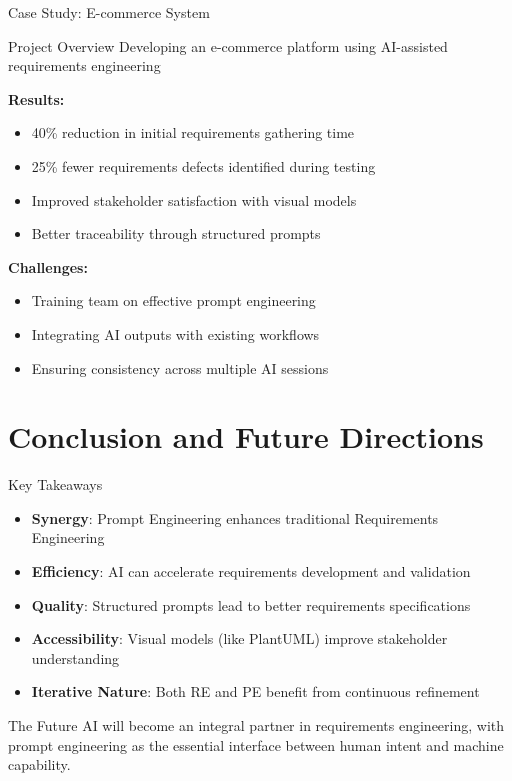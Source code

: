 \documentclass{beamer}
\begin{document}
\begin{frame}{Case Study: E-commerce System}
    \begin{block}{Project Overview}
        Developing an e-commerce platform using AI-assisted requirements engineering
    \end{block}
    
    \textbf{Results:}
    \begin{itemize}
        \item 40\% reduction in initial requirements gathering time
        \item 25\% fewer requirements defects identified during testing
        \item Improved stakeholder satisfaction with visual models
        \item Better traceability through structured prompts
    \end{itemize}
    
    \textbf{Challenges:}
    \begin{itemize}
        \item Training team on effective prompt engineering
        \item Integrating AI outputs with existing workflows
        \item Ensuring consistency across multiple AI sessions
    \end{itemize}
\end{frame}

\section{Conclusion and Future Directions}

\begin{frame}{Key Takeaways}
    \begin{itemize}
        \item \textbf{Synergy}: Prompt Engineering enhances traditional Requirements Engineering
        \item \textbf{Efficiency}: AI can accelerate requirements development and validation
        \item \textbf{Quality}: Structured prompts lead to better requirements specifications
        \item \textbf{Accessibility}: Visual models (like PlantUML) improve stakeholder understanding
        \item \textbf{Iterative Nature}: Both RE and PE benefit from continuous refinement
    \end{itemize}
    
    \begin{block}{The Future}
        AI will become an integral partner in requirements engineering, with prompt engineering as the essential interface between human intent and machine capability.
    \end{block}
\end{frame}
\end{document}
